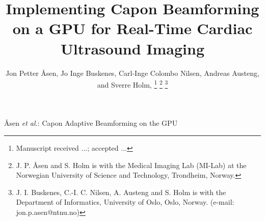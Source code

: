 %
\title{Implementing Capon Beamforming on a GPU for Real-Time Cardiac Ultrasound Imaging}
%
%
%

\author{Jon Petter \AA{}sen,  Jo Inge Buskenes, Carl-Inge Colombo Nilsen,  Andreas Austeng,  and Sverre Holm,  %
\thanks{Manuscript received ...; accepted ...}
\thanks{J. P. \AA{}sen and S. Holm is with the Medical Imaging Lab (MI-Lab) at the Norwegian University of Science and Technology, Trondheim, Norway.}
\thanks{J. I. Buskenes, C.-I. C. Nilsen, A. Austeng and S. Holm is with the Department of Informatics, University of Oslo, Oslo, Norway. (e-mail: jon.p.asen@ntnu.no)} 
}


% 
%



%
{\AA{}sen \MakeLowercase{\textit{et al.}}: Capon Adaptive Beamforming on the GPU}
% 





